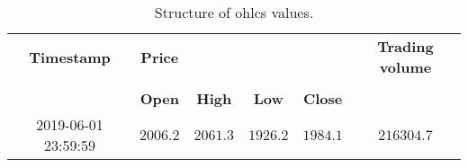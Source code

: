 \begin{table}[ht]
    \centering
    \begin{tabular}{ c c c c c c }
        \hline
        \textbf{Timestamp} & \textbf{Price} & & & & \textbf{Trading volume} \\
        \cline{2-5}\\
                  & \textbf{Open}  & \textbf{High} & \textbf{Low} & \textbf{Close} & \\
        \hline
        2019-06-01 23:59:59 & $2006.2$ &  $2061.3$ & $1926.2$ & $1984.1$ & $216304.7$\\
        \hline
    \end{tabular}
    \caption[Structure - \Acf{ohlc}]{Structure of \acp{ohlc} values.}
    \label{tab:ohlcv}
\end{table}

